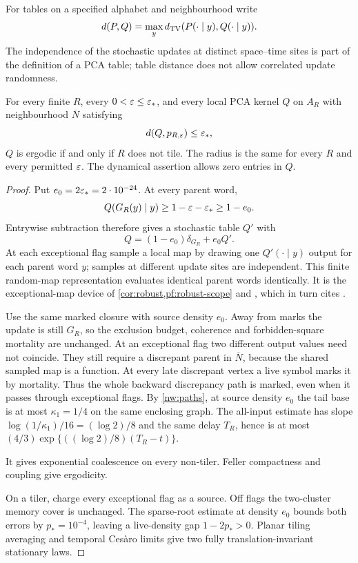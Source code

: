 For tables on a specified alphabet and neighbourhood write
\[
 d(P,Q)=\max_yd_{\mathrm{TV}}(P(\cdot\mid y),Q(\cdot\mid y)).
\]
The independence of the stochastic updates at distinct space--time sites is part of the definition of a PCA table; table distance does not allow correlated update randomness.

\begin{corollary}\label{nw:robust}
For every finite $R$, every $0<\varepsilon\le\varepsilon_*$, and every local PCA kernel $Q$ on $A_R$ with neighbourhood $\overline N$ satisfying
\[
 d(Q,p_{R,\varepsilon})\le\varepsilon_*,
\]
$Q$ is ergodic if and only if $R$ does not tile. The radius is the same for every $R$ and every permitted $\varepsilon$. The dynamical assertion allows zero entries in $Q$.
\end{corollary}
\begin{proof}
Put $e_0=2\varepsilon_*=2\cdot10^{-24}$. At every parent word,
\[
 Q(G_R(y)\mid y)\ge1-\varepsilon-\varepsilon_*\ge1-e_0.
\]
Entrywise subtraction therefore gives a stochastic table $Q'$ with
\[
 Q=(1-e_0)\delta_{G_R}+e_0Q'.
\]
At each exceptional flag sample a local map by drawing one $Q'(\cdot\mid y)$ output for each parent word $y$; samples at different update sites are independent. This finite random-map representation evaluates identical parent words identically. It is the exceptional-map device of \cref{cor:robust,pf:robust-scope} and \cite[Theorem~B.1]{DMdiagram}, which in turn cites \cite[Proposition~4.5]{DM26}.

Use the same marked closure with source density $e_0$. Away from marks the update is still $G_R$, so the exclusion budget, coherence and forbidden-square mortality are unchanged. At an exceptional flag two different output values need not coincide. They still require a discrepant parent in $\overline N$, because the shared sampled map is a function. At every late discrepant vertex a live symbol marks it by mortality. Thus the whole backward discrepancy path is marked, even when it passes through exceptional flags. By \cref{nw:paths}, at source density $e_0$ the tail base is at most $\kappa_1=1/4$ on the same enclosing graph. The all-input estimate has slope $\log(1/\kappa_1)/16=(\log2)/8$ and the same delay $T_R$, hence is at most $(4/3)\exp\{((\log2)/8)(T_R-t)\}$.

It gives exponential coalescence on every non-tiler. Feller compactness and coupling give ergodicity.

On a tiler, charge every exceptional flag as a source. Off flags the two-cluster memory cover is unchanged. The sparse-root estimate at density $e_0$ bounds both errors by $p_*=10^{-4}$, leaving a live-density gap $1-2p_*>0$. Planar tiling averaging and temporal Ces\`aro limits give two fully translation-invariant stationary laws.
\end{proof}

